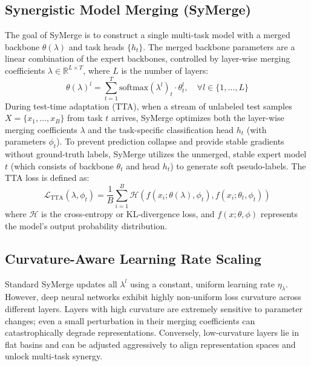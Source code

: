 \documentclass{article}
\begin{document}
\subsection{Synergistic Model Merging (SyMerge)}
The goal of SyMerge is to construct a single multi-task model with a merged backbone $\theta(\lambda)$ and task heads $\{h_t\}$. The merged backbone parameters are a linear combination of the expert backbones, controlled by layer-wise merging coefficients $\lambda \in \mathbb{R}^{L \times T}$, where $L$ is the number of layers:
\begin{equation}
    \theta(\lambda)^l = \sum_{t=1}^T \text{softmax}(\lambda^l)_t \cdot \theta_t^l, \quad \forall l \in \{1,\dots,L\}
\end{equation}
During test-time adaptation (TTA), when a stream of unlabeled test samples $X = \{x_1, \dots, x_B\}$ from task $t$ arrives, SyMerge optimizes both the layer-wise merging coefficients $\lambda$ and the task-specific classification head $h_t$ (with parameters $\phi_t$). To prevent prediction collapse and provide stable gradients without ground-truth labels, SyMerge utilizes the unmerged, stable expert model $t$ (which consists of backbone $\theta_t$ and head $h_t$) to generate soft pseudo-labels. The TTA loss is defined as:
\begin{equation}
    \mathcal{L}_{\text{TTA}}(\lambda, \phi_t) = \frac{1}{B} \sum_{i=1}^B \mathcal{H}\left( f(x_i; \theta(\lambda), \phi_t), f(x_i; \theta_t, \phi_t) \right)
\end{equation}
where $\mathcal{H}$ is the cross-entropy or KL-divergence loss, and $f(x; \theta, \phi)$ represents the model's output probability distribution.

\subsection{Curvature-Aware Learning Rate Scaling}
Standard SyMerge updates all $\lambda^l$ using a constant, uniform learning rate $\eta_{\lambda}$. However, deep neural networks exhibit highly non-uniform loss curvature across different layers. Layers with high curvature are extremely sensitive to parameter changes; even a small perturbation in their merging coefficients can catastrophically degrade representations. Conversely, low-curvature layers lie in flat basins and can be adjusted aggressively to align representation spaces and unlock multi-task synergy.
\end{document}
